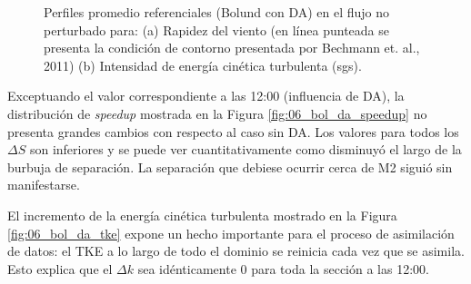 \begin{figure}[H]
	\caption{Perfiles promedio referenciales (Bolund con DA) en el flujo no perturbado para: (a) Rapidez del viento (en línea punteada se presenta la condición de contorno presentada por Bechmann et. al., 2011) (b) Intensidad de energía cinética turbulenta (sgs).}
	\label{fig:06_bol_da_referencia}
\end{figure}

Exceptuando el valor correspondiente a las 12:00 (influencia de DA), la distribución de \emph{speedup} mostrada en la Figura \ref{fig:06_bol_da_speedup} no presenta grandes cambios con respecto al caso sin DA. Los valores para todos los $\Delta S$ son inferiores y se puede ver cuantitativamente como disminuyó el largo de la burbuja de separación. La separación que debiese ocurrir cerca de M2 siguió sin manifestarse.

El incremento de la energía cinética turbulenta mostrado en la Figura \ref{fig:06_bol_da_tke} expone un hecho importante para el proceso de asimilación de datos: el TKE a lo largo de todo el dominio se reinicia cada vez que se asimila. Esto explica que el $\Delta k$ sea idénticamente 0 para toda la sección a las 12:00. 

